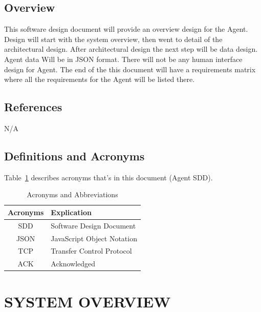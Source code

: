 \documentclass[letterpaper,12pt,oneside,listof=totoc]{scrreprt}
\begin{document}
\section{Overview}
This software design document will provide an overview design for the Agent. Design will start with the system overview, then went to detail of the architectural design. After architectural design the next step will be data design. Agent data Will be in JSON format. There will not be any human interface design for Agent. The end of the this document will have a requirements matrix where all the requirements for the Agent will be listed there.


\section{References}
N/A

\section{Definitions and Acronyms}

Table~\ref{Acronyms} describes acronyms that's in this document (Agent SDD).

\begin{table}[h!]
\centering
\begin{tabular}{| c | p{} |} 
\hline
Acronyms & Explication\\
\hline
SDD & Software Design Document\\
\hline
JSON & JavaScript Object Notation \\
\hline
TCP & Transfer Control Protocol\\
\hline
ACK & Acknowledged \\
\hline


\end{tabular}
\caption{Acronyms and Abbreviations}
\label{Acronyms}
\end{table}





\chapter{SYSTEM OVERVIEW}
\end{document}
